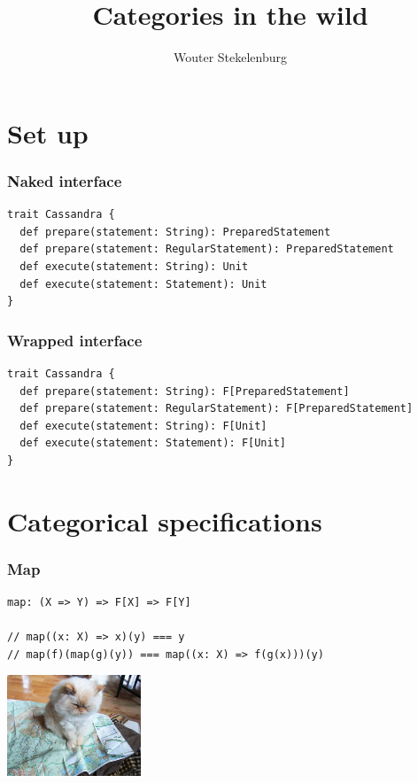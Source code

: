 \documentclass{beamer}
\title{Categories in the wild}
\author{Wouter Stekelenburg}
\newcommand\hide[1]{}
\begin{document}
\lstset{style=Scala}
\begin{frame}
  \titlepage
\end{frame}

\hide{
\begin{frame}[plain]
\frametitle{Categories are like \dots}
Categories are like cats. It is easy to learn what they are, but that doesn't mean you understand them or can work with them without getting hurt.
\end{frame}
}

\section{Set up}
\begin{frame}[fragile]
\frametitle{Naked interface}

\begin{lstlisting}
trait Cassandra {
  def prepare(statement: String): PreparedStatement
  def prepare(statement: RegularStatement): PreparedStatement
  def execute(statement: String): Unit
  def execute(statement: Statement): Unit
}
\end{lstlisting}

\end{frame}

\begin{frame}[fragile]
\frametitle{Wrapped interface}

\begin{lstlisting}
trait Cassandra {
  def prepare(statement: String): F[PreparedStatement]
  def prepare(statement: RegularStatement): F[PreparedStatement]
  def execute(statement: String): F[Unit]
  def execute(statement: Statement): F[Unit]
}
\end{lstlisting}

\end{frame}

\section{Categorical specifications}

\begin{frame}[fragile]
\frametitle{Map}
\begin{lstlisting}
map: (X => Y) => F[X] => F[Y]

// map((x: X) => x)(y) === y
// map(f)(map(g)(y)) === map((x: X) => f(g(x)))(y)
\end{lstlisting}
\begin{center} \includegraphics[height=3cm]{cat_map.jpg} \end{center}
\end{frame}
\end{document}
